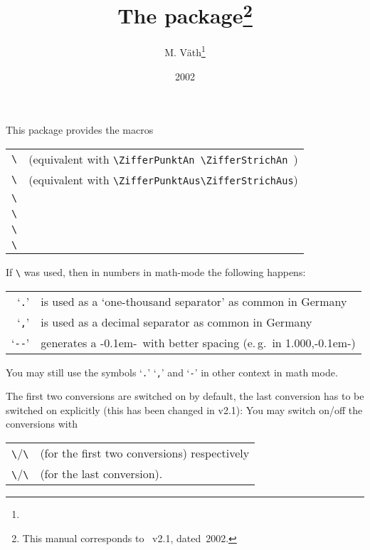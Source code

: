 \documentclass[pagesize=auto]{scrartcl}
\title{The \pkg{ziffer} package\thanks{This manual corresponds to \pkg{ziffer.sty}~v2.1, dated~2002.}}
\author{M. Väth\thanks{\mail{vaeth@mathematik.uni-wuerzburg.de}}}
\date{2002}
\makeatletter
\newcommand*{\cs}[1]{\texttt{\textbackslash#1}}
\newcommand*{\cmd}[1]{\cs{\expandafter\@gobble\string#1}}
\newcommand*{\ZifferStrich}{\textrm{-\kern0.1em-}}
\makeatother
\begin{document}
\maketitle

\noindent
This package provides the macros
%
\begin{flushleft}
  \begin{tabular}{@{}ll@{}}
    \cmd{\ZifferAn}  & (equivalent with \verb+\ZifferPunktAn \ZifferStrichAn +) \\
    \cmd{\ZifferAus} & (equivalent with \verb+\ZifferPunktAus\ZifferStrichAus+) \\
    \cmd{\ZifferPunktAn}                                                        \\
    \cmd{\ZifferPunktAus}                                                       \\
    \cmd{\ZifferStrichAn}                                                       \\
    \cmd{\ZifferStrichAus}
  \end{tabular}
\end{flushleft}
%
If \cmd{\ZifferAn} was used, then in numbers in math-mode the following happens:
%
\begin{flushleft}
  \begin{tabular}{@{}rl@{}}
    `\texttt{.}'  & is used as a `one-thousand separator' as common in Germany \\
    `\texttt{,}'  & is used as a decimal separator as common in Germany        \\
    `\texttt{-{}-}' & generates a \ZifferStrich\ with better spacing (e.\,g.\ in 1.000,\ZifferStrich)
  \end{tabular}
\end{flushleft}
%
You may still use the symbols `\texttt{.}' `\texttt{,}' and `\texttt{-}' in other context in math mode.

The first two conversions are switched on by default, the last conversion has
to be switched on explicitly (this has been changed in v2.1):
You may switch on/off the conversions with
%
\begin{flushleft}
  \begin{tabular}{@{}ll@{}}
    \cmd{\ZifferPunktAn}/\cmd{\ZifferPunktAus}   & (for the first two conversions) respectively \\
    \cmd{\ZifferStrichAn}/\cmd{\ZifferStrichAus} & (for the last conversion).
  \end{tabular}
\end{flushleft}
\end{document}

